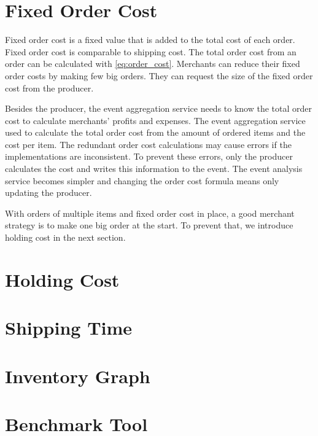 \section{Fixed Order Cost}
\label{section:fixed_order_cost}
Fixed order cost is a fixed value that is added to the total cost of each order.
Fixed order cost is comparable to shipping cost.
The total order cost from an order can be calculated with \cref{eq:order_cost}.
Merchants can reduce their fixed order costs by making few big orders.
They can request the size of the fixed order cost from the producer.

Besides the producer, the event aggregation service needs to know the total order cost to calculate merchants' profits and expenses.
The event aggregation service used to calculate the total order cost from the amount of ordered items and the cost per item.
The redundant order cost calculations may cause errors if the implementations are inconsistent.
To prevent these errors, only the producer calculates the cost and writes this information to the event.
The event analysis service becomes simpler and changing the order cost formula means only updating the producer.

With orders of multiple items and fixed order cost in place, a good merchant strategy is to make one big order at the start.
To prevent that, we introduce holding cost in the next section.

\section{Holding Cost}
\label{section:holding_cost}





\section{Shipping Time}
\label{section:shipping_time}

\section{Inventory Graph}
\label{section:inventory_graph}

\section{Benchmark Tool}
\label{section:benchmark_tool}

